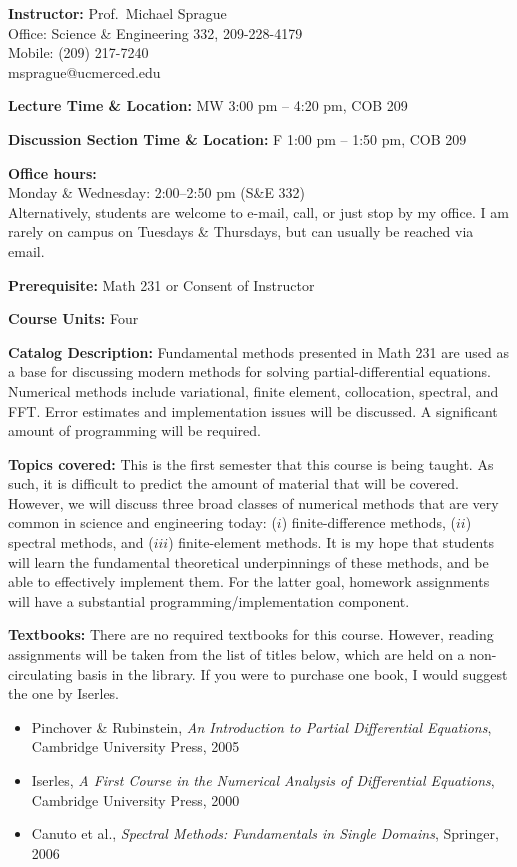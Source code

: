 \documentclass{article}
\begin{document}
\sloppy 
\textbf{Instructor:} 
Prof.~Michael Sprague\\ 
Office: Science \& Engineering 332, 209-228-4179\\
Mobile: (209) 217-7240\\
msprague@ucmerced.edu

\textbf{Lecture Time \& Location:} MW 3:00 pm -- 4:20 pm, COB 209  

\textbf{Discussion Section Time \& Location:} 
F 1:00 pm -- 1:50 pm, COB 209 

\textbf{Office hours:} \\
Monday \& Wednesday:  2:00--2:50 pm  (S\&E 332)\\
Alternatively, students are welcome to e-mail, call, or just stop by my
office.  I am rarely on campus on Tuesdays \& Thursdays, but can usually be
reached via email.

\textbf{Prerequisite:} Math 231 or Consent of Instructor

\textbf{Course Units:} Four

\textbf{Catalog Description:} 
Fundamental methods presented in Math 231 are used as a base for discussing
modern methods for solving partial-differential equations.  Numerical
methods include variational, finite element, collocation,  spectral, and
FFT. Error estimates and implementation issues will be discussed.  A
significant amount of programming will be required.

\textbf{Topics covered:} This is the first semester that this course is
being taught.  As such, it is difficult to predict the amount of material
that will be covered.  However, we will discuss three broad classes of
numerical methods that are very common in science and engineering today:
($i$) finite-difference methods, ($ii$) spectral methods, and ($iii$)
finite-element methods.   It is my hope that students will learn the
fundamental theoretical underpinnings of these methods, and be able to
effectively implement them.   For the latter goal, homework assignments will
have a substantial programming/implementation component.

\textbf{Textbooks:} There are no required textbooks for this course.
However, reading assignments will be taken from the list of titles below,
which are held on a non-circulating basis in the library. If you were to
purchase one book, I would suggest the one by Iserles.
\begin{itemize}

 \item Pinchover \& Rubinstein, \textit{An Introduction to Partial
Differential Equations}, Cambridge University Press, 2005

 \item Iserles, \textit{A First Course in the Numerical Analysis of
Differential Equations}, Cambridge University Press, 2000

\item Canuto et al., \textit{Spectral Methods: Fundamentals in Single
Domains}, Springer, 2006

\end{itemize}
\end{document}
